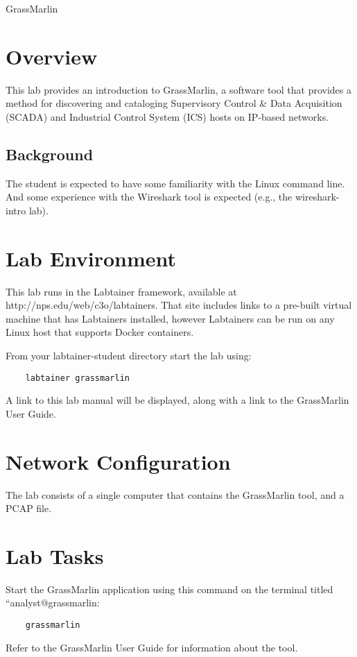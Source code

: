 


\begin{center}
{\LARGE GrassMarlin}
\vspace{0.1in}\\
\end{center}

\section{Overview}
This lab provides an introduction to GrassMarlin, a software tool that provides a method for discovering and cataloging
Supervisory Control \& Data Acquisition (SCADA) and Industrial Control System (ICS) hosts on IP-based
networks.

\subsection {Background}
The student is expected to have some familiarity with the Linux command line.
And some experience with the Wireshark tool is expected (e.g., the wireshark-intro lab).

\section{Lab Environment}
This lab runs in the Labtainer framework,
available at http://nps.edu/web/c3o/labtainers.
That site includes links to a pre-built virtual machine
that has Labtainers installed, however Labtainers can
be run on any Linux host that supports Docker containers.

From your labtainer-student directory start the lab using:
\begin{verbatim}
    labtainer grassmarlin
\end{verbatim}
\noindent A link to this lab manual will be displayed, along with a link to the
GrassMarlin User Guide.


\section{Network Configuration}
The lab consists of a single computer that contains the GrassMarlin tool, and a PCAP file.

\section{Lab Tasks}
Start the GrassMarlin application using this command on the terminal titled ``analyst@grassmarlin:
\begin{verbatim}
    grassmarlin
\end{verbatim}
\noindent Refer to the GrassMarlin User Guide for information about the tool.

